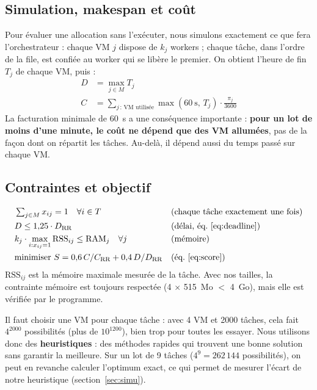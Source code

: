 \subsection{Simulation, makespan et coût}

Pour évaluer une allocation sans l'exécuter, nous simulons exactement ce que fera
l'orchestrateur : chaque VM $j$ dispose de $k_j$ workers ; chaque tâche, dans
l'ordre de la file, est confiée au worker qui se libère le premier. On obtient
l'heure de fin $T_j$ de chaque VM, puis :
\begin{align}
  D &= \max_{j \in M} T_j \\
  C &= \sum_{j \,:\, \text{VM utilisée}} \max(60\ \text{s},\, T_j) \cdot \frac{\pi_j}{3600}
\end{align}
La facturation minimale de 60~s a une conséquence importante : \textbf{pour un
lot de moins d'une minute, le coût ne dépend que des VM allumées}, pas de la
façon dont on répartit les tâches. Au-delà, il dépend aussi du temps passé sur
chaque VM.

\subsection{Contraintes et objectif}

\begin{align}
  & \textstyle\sum_{j \in M} x_{ij} = 1 \quad \forall i \in T
    && \text{(chaque tâche exactement une fois)} \\
  & D \le 1{,}25 \cdot D_{\mathrm{RR}}
    && \text{(délai, éq.~\ref{eq:deadline})} \\
  & k_j \cdot \max_{i : x_{ij}=1} \mathrm{RSS}_{ij} \le \mathrm{RAM}_j \quad \forall j
    && \text{(mémoire)} \\
  & \text{minimiser } S = 0{,}6\, C/C_{\mathrm{RR}} + 0{,}4\, D/D_{\mathrm{RR}}
    && \text{(éq.~\ref{eq:score})}
\end{align}
$\mathrm{RSS}_{ij}$ est la mémoire maximale mesurée de la tâche. Avec nos tailles,
la contrainte mémoire est toujours respectée (4 $\times$ 515~Mo $<$ 4~Go), mais
elle est vérifiée par le programme.

Il faut choisir une VM pour chaque tâche : avec 4 VM et 2000 tâches, cela fait
$4^{2000}$ possibilités (plus de $10^{1200}$), bien trop pour toutes les essayer.
Nous utilisons donc des \textbf{heuristiques} : des méthodes rapides qui
trouvent une bonne solution sans garantir la meilleure. Sur un lot de 9 tâches
($4^9 = 262\,144$ possibilités), on peut en revanche calculer l'optimum exact, ce
qui permet de mesurer l'écart de notre heuristique (section~\ref{sec:simu}).

